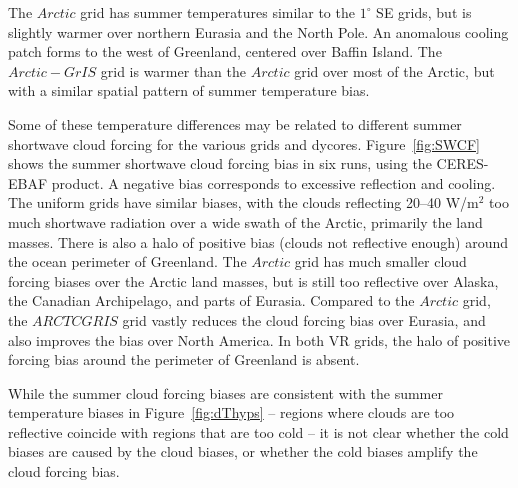\documentclass[draft]{agujournal2019}
\begin{document}
The $Arctic$ grid has summer temperatures similar to the $1^{\circ}$ SE grids, but is slightly warmer over northern Eurasia and the North Pole. An anomalous cooling patch forms to the west of Greenland, centered over Baffin Island. The $Arctic-GrIS$ grid is warmer than the $Arctic$ grid over most of the Arctic, but with a similar spatial pattern of summer temperature bias.

Some of these temperature differences may be related to different summer shortwave cloud forcing for the various grids and dycores. Figure~\ref{fig:SWCF} shows the summer shortwave cloud forcing bias in six runs, using the CERES-EBAF product. 
A negative bias corresponds to excessive reflection and cooling.
The uniform grids have similar biases, with the clouds reflecting 20--40 W/m$^2$ too much shortwave radiation over a wide swath of the Arctic, primarily the land masses. There is also a halo of positive bias (clouds not reflective enough) around the ocean perimeter of Greenland. The $Arctic$ grid has much smaller cloud forcing biases over the Arctic land masses, but is still too reflective over Alaska, the Canadian Archipelago, and parts of Eurasia.  Compared to the $Arctic$ grid, the $ARCTCGRIS$ grid vastly reduces the cloud forcing bias over Eurasia, and also improves the bias over North America. In both VR grids, the halo of positive forcing bias around the perimeter of Greenland is absent.

While the summer cloud forcing biases are consistent with the summer temperature biases in Figure~\ref{fig:dThyps} -- regions where clouds are too reflective coincide with regions that are too cold -- it is not clear whether the cold biases are caused by the cloud biases, or whether the cold biases amplify the cloud forcing bias.
\end{document}

